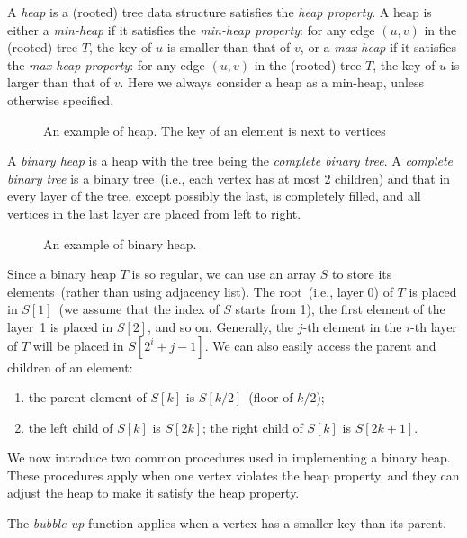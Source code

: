 A \emph{heap} is a (rooted) tree data structure satisfies the \emph{heap property}.
A heap is either a \emph{min-heap} if it satisfies the \emph{min-heap property}: for any edge $(u, v)$ in the (rooted) tree $T$,
the key of $u$ is smaller than that of $v$,
or a \emph{max-heap} if it satisfies the \emph{max-heap property}: for any edge $(u, v)$ in the (rooted) tree $T$,
the key of $u$ is larger than that of $v$.
Here we always consider a heap as a min-heap, unless otherwise specified.

\begin{figure}[h!]
\centering{}
\caption{An example of heap. The key of an element is next to vertices}
\end{figure}

A \emph{binary heap} is a heap with the tree being the \emph{complete binary tree}.
A \emph{complete binary tree} is a binary tree~(i.e., each vertex has at most 2 children)
and that in every layer of the tree, except possibly the last, is completely filled, and all vertices in the last layer are placed from left to right.

\begin{figure}[h!]
\centering{}
\caption{An example of binary heap.}
\end{figure}

Since a binary heap $T$ is so regular, we can use an array $S$ to store its elements~(rather than using adjacency list).
The root~(i.e., layer 0) of $T$ is placed in $S[1]$~(we assume that the index of $S$ starts from 1),
the first element of the layer~1 is placed in $S[2]$, and so on.
Generally, the $j$-th element in the $i$-th layer of $T$ will be placed in $S[2^i + j - 1]$.
We can also easily access the parent and children of an element:
\vspace*{-\topsep}
\begin{enumerate}
\item the parent element of $S[k]$ is $S[k/2]$~(floor of $k/2$);
\item the left child of $S[k]$ is $S[2k]$; the right child of $S[k]$ is $S[2k + 1]$.
\end{enumerate}

We now introduce two common procedures used in implementing a binary heap.
These procedures apply when one vertex violates the heap property,
and they can adjust the heap to make it satisfy the heap property.

The \emph{bubble-up} function applies when a vertex has a smaller key than its parent.


